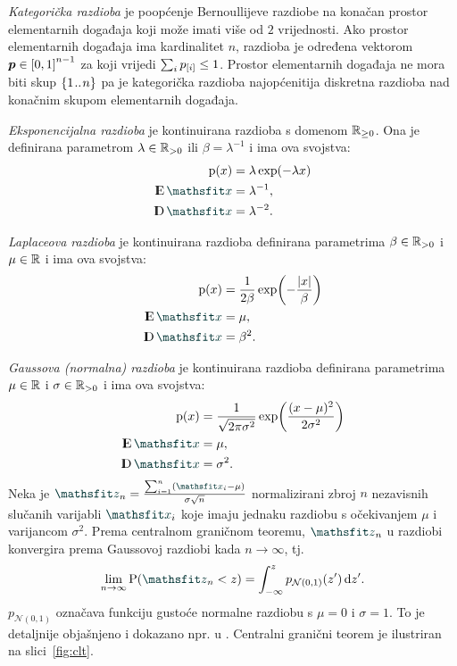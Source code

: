 \documentclass[utf8, diplomski, lmodern]{fer}
\begin{document}
\emph{Kategorička razdioba} je poopćenje Bernoullijeve razdiobe na konačan prostor elementarnih događaja koji može imati više od $2$ vrijednosti. Ako prostor elementarnih događaja ima kardinalitet $n$, razdioba je određena vektorom $\vec p\in\intcc{0,1}^{n-1}$ za koji vrijedi $\sum_i p_{[i]}\leq 1$. Prostor elementarnih događaja ne mora biti skup $\cbr{1\bidot n}$ pa je kategorička razdioba najopćenitija diskretna razdioba nad konačnim skupom elementarnih događaja.

\emph{Eksponencijalna razdioba} je kontinuirana razdioba s domenom $\mathbb{R}_{\geq0}$. Ona je definirana parametrom $\lambda\in\mathbb{R}_{>0}$ ili $\beta=\lambda^{-1}$ i ima ova svojstva:
\begin{align}
\p(x) &= \lambda\exp(-\lambda x) \\
\E \rvar x &= \lambda^{-1}, \\
\D \rvar x &= \lambda^{-2} \text{.}
\end{align}

\emph{Laplaceova razdioba} je kontinuirana razdioba definirana parametrima $\beta\in\mathbb{R}_{>0}$ i $\mu \in \mathbb{R}$ i ima ova svojstva:
\begin{align}
\p(x) &= \frac{1}{2\beta}\exp\del{-\frac{\envert{x}}{\beta}} \\
\E \rvar x &= \mu, \\
\D \rvar x &= \beta^2 \text{.}
\end{align}

\emph{Gaussova (normalna) razdioba} je kontinuirana razdioba definirana parametrima $\mu\in\mathbb{R}$ i $\sigma \in \mathbb{R}_{>0}$ i ima ova svojstva:
\begin{align}
\p(x) &= \frac{1}{\sqrt{2\pi\sigma^2}}\exp\del{\frac{\del{x-\mu}^2}{2\sigma^2}} \\
\E \rvar x &= \mu, \\
\D \rvar x &= \sigma^2 \text{.}
\end{align}
Neka je $\rvar z_n = \frac{\sum_{i=1}^n \del{\rvar x_i-\mu}}{\sigma\sqrt{n}}$ normalizirani zbroj $n$ nezavisnih slučanih varijabli $\rvar x_i$ koje imaju jednaku razdiobu s očekivanjem $\mu$ i varijancom $\sigma^2$. Prema centralnom graničnom teoremu, $\rvar z_n$ u razdiobi konvergira prema Gaussovoj razdiobi kada $n\to\infty$, tj.
\begin{align}
\lim_{n\to\infty} \P(\rvar z_n<z) = \int_{-\infty}^{z} p_{\mathcal{N}(0,1)}(z')\dif{z'} \text{.}
\end{align}
$p_{\mathcal{N}(0,1)}$ označava funkciju gustoće normalne razdiobu s $\mu=0$ i $\sigma=1$. To je detaljnije objašnjeno i dokazano npr. u \citep{Elezovic:2007:VSSV}. Centralni granični teorem je ilustriran na slici~\ref{fig:clt}.
\end{document}
